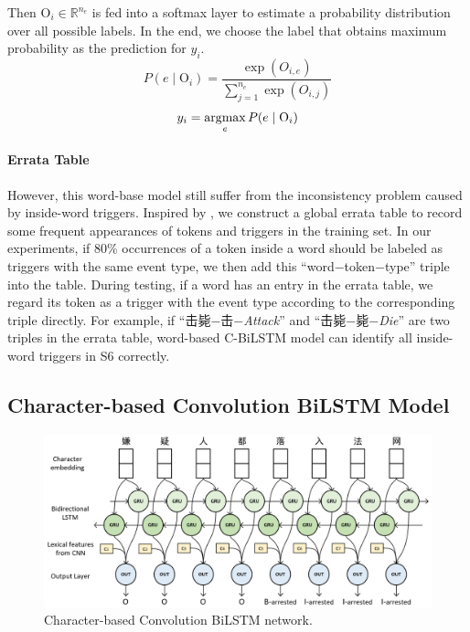 Then $\text{O}_i \in \mathbb{R}^{n_e}$ is fed into a softmax layer to estimate a probability distribution over all possible labels. In the end, we choose the label that obtains maximum probability as the prediction for $y_i$.
\begin{equation}
	P(e \mid \text{O}_i) = \frac{\exp{(O_{i,e})}}{\sum\nolimits_{j=1}^{n_e}\exp{(O_{i,j})}}
\end{equation}
\begin{equation}
  	y_i = \argmax\limits_{e}{P(e \mid \text{O}_i)}
\end{equation}

\paragraph{Errata Table}
However, this word-base model still suffer from  the inconsistency problem caused by inside-word triggers. Inspired by , we construct a global errata table to record some frequent appearances of tokens and triggers in the training set. In our experiments, if 80\% occurrences of a token inside a word should be labeled as triggers with the same event type, we then add this ``word$-$token$-$type'' triple into the table. During testing, if a word has an entry in the errata table, we regard its token as a trigger with the event type according to the corresponding triple directly. For example, if ``击毙$-$击$-$\emph{Attack}'' and ``击毙$-$毙$-$\emph{Die}'' are two triples in the errata table, word-based C-BiLSTM model can identify all inside-word triggers in S6 correctly.

\subsection{Character-based Convolution BiLSTM Model \label{ccblstm}}
\begin{figure}
\centering
\includegraphics[width=.9\textwidth]{RNN2.png}
\caption{Character-based Convolution BiLSTM network.}
\label{figure2}
\end{figure}

